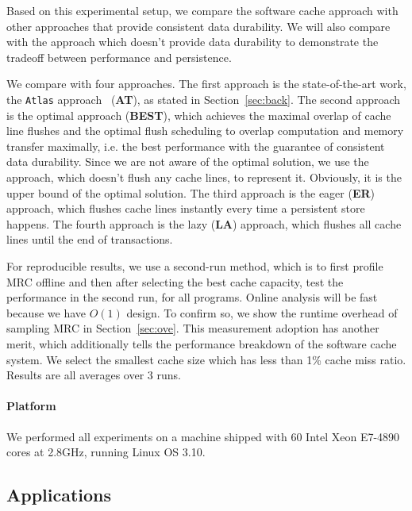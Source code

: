 \documentclass[preprint,nocopyrightspace,10pt]{sigplanconf}
\begin{document}
Based on this experimental setup, we compare the software cache approach with
other approaches that provide consistent data durability. We will also compare with
the approach which doesn't provide data durability to demonstrate the tradeoff between
performance and persistence.

We compare with four approaches. The first approach is the state-of-the-art work,
the \texttt{Atlas} approach~\cite{Dhruva+:OOPSLA14} ({\bf AT}), as stated in Section~\ref{sec:back}. 
The second approach is the optimal approach ({\bf BEST}), which achieves the maximal 
overlap of cache line flushes and the optimal flush scheduling to overlap computation 
and memory transfer maximally, i.e. the best performance with the guarantee of consistent
data durability. Since we are not aware of the optimal solution, we use the approach,
which doesn't flush any cache lines, to represent it. Obviously, it is the upper bound of 
the optimal solution. The third approach is the eager ({\bf ER}) approach, which flushes 
cache lines instantly every time a persistent store happens. The fourth approach is the 
lazy ({\bf LA}) approach, which flushes all cache lines until the end of transactions.

For reproducible results, we use a second-run method, which is to first 
profile MRC offline and then after selecting the best cache capacity, 
test the performance in the second run, for all programs. Online analysis 
will be fast because we have $O(1)$ design. To confirm so, we show 
the runtime overhead of sampling MRC in Section~\ref{sec:ove}.
This measurement adoption has another merit, which additionally tells 
the performance breakdown of the software cache system. We select 
the smallest cache size which has less than 1\% cache miss ratio.
Results are all averages over 3 runs. 

\paragraph{Platform}
We performed all experiments on a machine shipped with 60 Intel Xeon E7-4890 cores at 2.8GHz, 
running Linux OS 3.10. 

\subsection{Applications}
\end{document}
